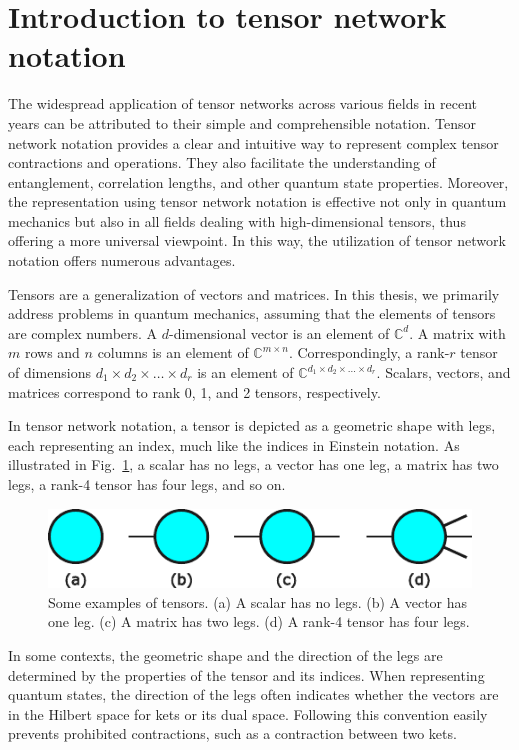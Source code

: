 \documentclass[12pt,dvipdfmx,twoside,openright]{report}
\begin{document}
\section{Introduction to tensor network notation}
The widespread application of tensor networks across various fields in recent years can be attributed to their simple and comprehensible notation.
Tensor network notation provides a clear and intuitive way to represent complex tensor contractions and operations.
They also facilitate the understanding of entanglement, correlation lengths, and other quantum state properties.
Moreover, the representation using tensor network notation is effective not only in quantum mechanics but also in all fields dealing with high-dimensional tensors, thus offering a more universal viewpoint.
In this way, the utilization of tensor network notation offers numerous advantages.

Tensors are a generalization of vectors and matrices.
In this thesis, we primarily address problems in quantum mechanics, assuming that the elements of tensors are complex numbers.
A $d$-dimensional vector is an element of $\mathbb C^d$.
A matrix with $m$ rows and $n$ columns is an element of $\mathbb C^{m \times n}$.
Correspondingly, a rank-$r$ tensor of dimensions $d_1\times d_2 \times \dots \times d_r$ is an element of $\mathbb C^{d_1\times d_2 \times \dots \times d_r}$.
Scalars, vectors, and matrices correspond to rank 0, 1, and 2 tensors, respectively.

In tensor network notation, a tensor is depicted as a geometric shape with legs, each representing an index, much like the indices in Einstein notation.
As illustrated in Fig.~\ref{fig:tensor-example}, a scalar has no legs, a vector has one leg, a matrix has two legs, a rank-4 tensor has four legs, and so on.

\begin{figure}
    \centering
    \includegraphics[width=0.5\linewidth]{tensor-example.pdf}
    \caption{Some examples of tensors. 
    (a) A scalar has no legs. 
    (b) A vector has one leg.
    (c) A matrix has two legs.
    (d) A rank-4 tensor has four legs.}
    \label{fig:tensor-example}
\end{figure}

In some contexts, the geometric shape and the direction of the legs are determined by the properties of the tensor and its indices.
When representing quantum states, the direction of the legs often indicates whether the vectors are in the Hilbert space for kets or its dual space.
Following this convention easily prevents prohibited contractions, such as a contraction between two kets.
\end{document}
